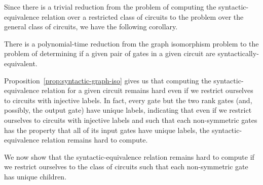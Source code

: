 \documentclass[../paper.tex]{subfiles}
\begin{document}
Since there is a trivial reduction from the problem of computing the
syntactic-equivalence relation over a restricted class of circuits to the
problem over the general class of circuits, we have the following corollary.

\begin{cor}
  There is a polynomial-time reduction from the graph isomorphism problem to the
  problem of determining if a given pair of gates in a given circuit are
  syntactically-equivalent.
  \label{cor:syntactically-equivilent-general-hard}
\end{cor}

Proposition~\ref{prop:syntactic-graph-iso} gives us that computing the
syntactic-equivalence relation for a given circuit remains hard even if we
restrict ourselves to circuits with injective labels. In fact, every gate but
the two rank gates (and, possibly, the output gate) have unique labels,
indicating that even if we restrict ourselves to circuits with injective labels
and such that each non-symmetric gates has the property that all of its input
gates have unique labels, the syntactic-equivalence relation remains hard to
compute.

We now show that the syntactic-equivalence relation remains hard to compute if
we restrict ourselves to the class of circuits such that each non-symmetric gate
has unique children.
\end{document}
